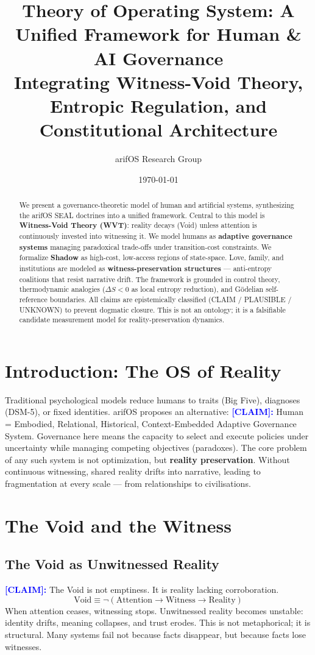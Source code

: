 \documentclass[11pt, a4paper]{article}
\title{\textbf{Theory of Operating System: A Unified Framework for Human \& AI Governance}\\[0.5em]
\large Integrating Witness-Void Theory, Entropic Regulation, and Constitutional Architecture}
\author{arifOS Research Group}
\date{\today}
\newcommand{\claim}[1]{\noindent\textbf{\textcolor{blue}{[CLAIM]:}} #1}
\begin{document}
\maketitle
\thispagestyle{empty}

\begin{abstract}
We present a governance-theoretic model of human and artificial systems, synthesizing the arifOS SEAL doctrines into a unified framework. Central to this model is \textbf{Witness-Void Theory (WVT)}: reality decays (Void) unless attention is continuously invested into witnessing it. We model humans as \textbf{adaptive governance systems} managing paradoxical trade-offs under transition-cost constraints. We formalize \textbf{Shadow} as high-cost, low-access regions of state-space. Love, family, and institutions are modeled as \textbf{witness-preservation structures} — anti-entropy coalitions that resist narrative drift. The framework is grounded in control theory, thermodynamic analogies ($\Delta S < 0$ as local entropy reduction), and Gödelian self-reference boundaries. All claims are epistemically classified (CLAIM / PLAUSIBLE / UNKNOWN) to prevent dogmatic closure. This is not an ontology; it is a falsifiable candidate measurement model for reality-preservation dynamics.
\end{abstract}

\section{Introduction: The OS of Reality}
Traditional psychological models reduce humans to traits (Big Five), diagnoses (DSM-5), or fixed identities. arifOS proposes an alternative:
\claim{Human = Embodied, Relational, Historical, Context-Embedded Adaptive Governance System.}
Governance here means the capacity to select and execute policies under uncertainty while managing competing objectives (paradoxes). The core problem of any such system is not optimization, but \textbf{reality preservation}. Without continuous witnessing, shared reality drifts into narrative, leading to fragmentation at every scale — from relationships to civilisations.

\section{The Void and the Witness}
\subsection{The Void as Unwitnessed Reality}
\claim{The Void is not emptiness. It is reality lacking corroboration.}
\[
\text{Void} \equiv \neg (\text{Attention} \to \text{Witness} \to \text{Reality})
\]
When attention ceases, witnessing stops. Unwitnessed reality becomes unstable: identity drifts, meaning collapses, and trust erodes. This is not metaphorical; it is structural. Many systems fail not because facts disappear, but because facts lose witnesses.
\end{document}
